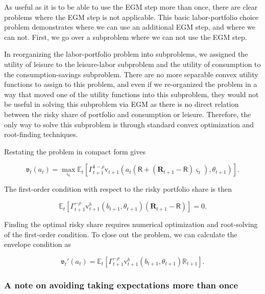 \documentclass{article}
\newcommand{\tShkEmp}{\theta}
\newcommand{\Ex}{\mathbb{E}}
\newcommand{\CRRA}{\rho}
\newcommand{\bRat}{b}
\newcommand{\vFunc}{\mathrm{v}}
\newcommand{\Rfree}{\mathsf{R}}
\newcommand{\riskyshare}{\varsigma}
\newcommand{\PGro}{\Gamma}
\newcommand{\aRat}{a}
\newcommand{\Rport}{\mathbb{R}}
\newcommand{\Risky}{\mathbf{R}}
\newcommand{\vEnd}{\mathfrak{v}}
\begin{document}
As useful as it is to be able to use the EGM step more than once, there are clear problems where the EGM step is not applicable. This basic labor-portfolio choice problem demonstrates where we can use an additional EGM step, and where we can not. First, we go over a subproblem where we can not use the EGM step.

In reorganizing the labor-portfolio problem into subproblems, we assigned the utility of leisure to the leisure-labor subproblem and the utility of consumption to the consumption-savings subproblem. There are no more separable convex utility functions to assign to this problem, and even if we re-organized the problem in a way that moved one of the utility functions into this subproblem, they would not be useful in solving this subproblem via EGM as there is no direct relation between the risky share of portfolio and consumption or leisure. Therefore, the only way to solve this subproblem is through standard convex optimization and root-finding techniques.

Restating the problem in compact form gives

\begin{equation}
\vEnd_{t}(\aRat_{t}) = \max_{\riskyshare_{t}}  \Ex_{t} \left[ \PGro_{t+1}^{1-\CRRA}
  \vFunc_{t+1}\left(\aRat_{t}(\Rfree + (\Risky_{t+1} - \Rfree) \riskyshare_{t}), \tShkEmp_{t+1}\right)
  \right].
\end{equation}

The first-order condition with respect to the risky portfolio share is then

\begin{equation}
\Ex_{t} \left[ \PGro_{t+1}^{-\CRRA} \vFunc_{t+1}^{\bRat}\left(\bRat_{t+1}, \tShkEmp_{t+1}\right) (\Risky_{t+1} - \Rfree)  \right] = 0.
\end{equation}

Finding the optimal risky share requires numerical optimization and root-solving of the first-order condition. To close out the problem, we can calculate the envelope condition as

\begin{equation}
\vEnd_{t}'(\aRat_{t}) =  \Ex_{t} \left[ \PGro_{t+1}^{-\CRRA} \vFunc_{t+1}^{\bRat}\left(\bRat_{t+1}, \tShkEmp_{t+1}\right) \Rport_{t+1}  \right].
\end{equation}

\subsubsection{A note on avoiding taking expectations more than once}\label{A note on avoiding taking expectations more than once}
\end{document}
